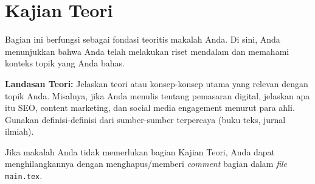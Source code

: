 \chapter{Kajian Teori} %


Bagian ini berfungsi sebagai fondasi teoritis makalah Anda. Di sini, Anda menunjukkan bahwa Anda telah melakukan riset mendalam dan memahami konteks topik yang Anda bahas.

\textbf{Landasan Teori:} Jelaskan teori atau konsep-konsep utama yang relevan dengan topik Anda. Misalnya, jika Anda menulis tentang pemasaran digital, jelaskan apa itu SEO, content marketing, dan social media engagement menurut para ahli. Gunakan definisi-definisi dari sumber-sumber terpercaya (buku teks, jurnal ilmiah).

Jika makalah Anda tidak memerlukan bagian Kajian Teori, Anda dapat menghilangkannya dengan menghapus/memberi \textit{comment} bagian \verb|| dalam \textit{file} \texttt{main.tex}.